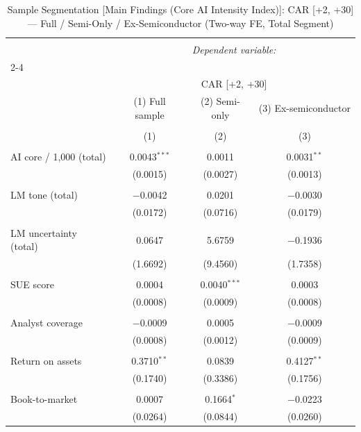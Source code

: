 
\begin{table}[!htbp] \centering 
  \caption{Sample Segmentation [Main Findings (Core AI Intensity Index)]: CAR [+2, +30] — Full / Semi-Only / Ex-Semiconductor (Two-way FE, Total Segment)} 
  \label{} 
\begin{tabular}{@{\extracolsep{5pt}}lccc} 
\\[-1.8ex]\hline 
\hline \\[-1.8ex] 
 & \multicolumn{3}{c}{\textit{Dependent variable:}} \\ 
\cline{2-4} 
\\[-1.8ex] & \multicolumn{3}{c}{CAR [+2, +30]} \\ 
 & (1) Full sample & (2) Semi-only & (3) Ex-semiconductor \\ 
\\[-1.8ex] & (1) & (2) & (3)\\ 
\hline \\[-1.8ex] 
 AI core / 1,000 (total) & 0.0043$^{***}$ & 0.0011 & 0.0031$^{**}$ \\ 
  & (0.0015) & (0.0027) & (0.0013) \\ 
  & & & \\ 
 LM tone (total) & $-$0.0042 & 0.0201 & $-$0.0030 \\ 
  & (0.0172) & (0.0716) & (0.0179) \\ 
  & & & \\ 
 LM uncertainty (total) & 0.0647 & 5.6759 & $-$0.1936 \\ 
  & (1.6692) & (9.4560) & (1.7358) \\ 
  & & & \\ 
 SUE score & 0.0004 & 0.0040$^{***}$ & 0.0003 \\ 
  & (0.0008) & (0.0009) & (0.0008) \\ 
  & & & \\ 
 Analyst coverage & $-$0.0009 & 0.0005 & $-$0.0009 \\ 
  & (0.0008) & (0.0012) & (0.0009) \\ 
  & & & \\ 
 Return on assets & 0.3710$^{**}$ & 0.0839 & 0.4127$^{**}$ \\ 
  & (0.1740) & (0.3386) & (0.1756) \\ 
  & & & \\ 
 Book-to-market & 0.0007 & 0.1664$^{*}$ & $-$0.0223 \\ 
  & (0.0264) & (0.0844) & (0.0260) \\ 

\end{tabular}
\end{table}
